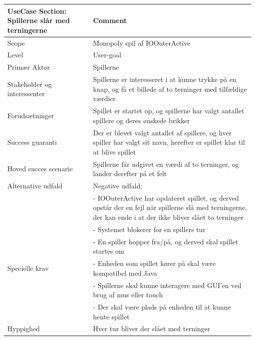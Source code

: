 \begin{center}
\begin{tabular}{ | m{10em} | m{10cm}| }
        \hline
            UseCase Section: Spillerne slår med terningerne & Comment\\
        \hline
            Scope & Monopoly spil af IOOuterActive\\
        \hline
            Level & User-goal\\
        \hline
            Primær Aktør & Spillerne\\
        \hline
            Stakeholder og interessenter & Spillerne er interesseret i at kunne trykke på en knap, og få et billede af to terninger med tilfældige værdier\\
        \hline
            Forudsætninger & Spillet er startet op, og spillerne har valgt antallet spillere og deres ønskede brikker\\
        \hline
            Success guaranti & Der er blevet valgt antallet af spillere, og hver spiller har valgt sit navn, herefter er spillet klar til at blive spillet\\
        \hline
            Hoved succes scenarie & Spillerne får udgivet en værdi af to terninger, og lander derefter på et felt\\
        \hline
            Alternative udfald & Negative udfald:\\
                & -	IOOuterActive har opdateret spillet, og derved opstår der en fejl når spillerne slå med terningerne, der kan ende i at der ikke bliver slået to terninger\\
                & -	Systemet blokerer for en spillers tur\\
                & -	En spiller hopper fra/på, og derved skal spillet startes om\\
        \hline
            Specielle krav
            & -	Enheden som spillet kører på skal være kompatibel med Java\\
            & -	Spillerne skal kunne interagere med GUI’en ved brug af mus eller touch\\
            & -	Der skal være plads på enheden til at kunne hente spillet\\
        \hline
            Hyppighed & Hver tur bliver der slået med terninger\\
        \hline
    \end{tabular}
\end{center}
